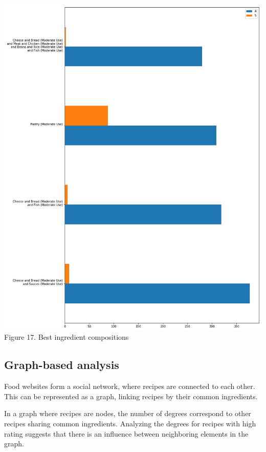 \documentclass[11pt]{article}
\begin{document}
\vspace{5mm}
\begin{center}
\includegraphics[scale=0.18]{ingredient-rating} \\
\label{ingredient-rating} Figure 17. Best ingredient compositions
\end{center}
\vspace{5mm}

\subsection{Graph-based analysis}

Food websites form a social network, where recipes are connected to each other. This can be represented as a graph, linking recipes by their common ingredients.

In a graph where recipes are nodes, the number of degrees correspond to other recipes sharing common ingredients. Analyzing the degrees for recipes with high rating suggests that there is an influence between neighboring elements in the graph.
\end{document}
